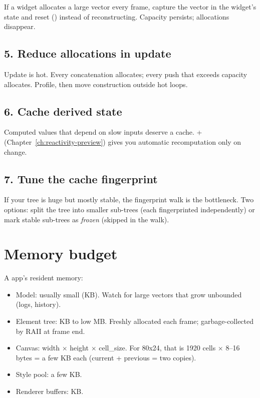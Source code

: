 If a widget allocates a large vector every frame, capture the
vector in the widget's state and reset ()
instead of reconstructing. Capacity persists; allocations
disappear.

\subsection*{5. Reduce allocations in update}

Update is hot. Every  concatenation allocates;
every  push that exceeds capacity allocates.
Profile, then move construction outside hot loops.

\subsection*{6. Cache derived state}

Computed values that depend on slow inputs deserve a cache.
 +  (Chapter~\ref{ch:reactivity-preview})
gives you automatic recomputation only on change.

\subsection*{7. Tune the cache fingerprint}

If your tree is huge but mostly stable, the fingerprint walk is
the bottleneck. Two options: split the tree into smaller
sub-trees (each fingerprinted independently) or mark stable
sub-trees as \emph{frozen} (skipped in the walk).

\section{Memory budget}

A \maya{} app's resident memory:

\begin{itemize}[leftmargin=*]
  \item Model: usually small (KB). Watch for large vectors
    that grow unbounded (logs, history).
  \item Element tree: KB to low MB. Freshly allocated each
    frame; garbage-collected by RAII at frame end.
  \item Canvas: width $\times$ height $\times$ cell\_size. For
    80x24, that is 1920 cells $\times$ 8--16 bytes = a few KB
    each (current + previous = two copies).
  \item Style pool: a few KB.
  \item Renderer buffers: KB.
\end{itemize}

